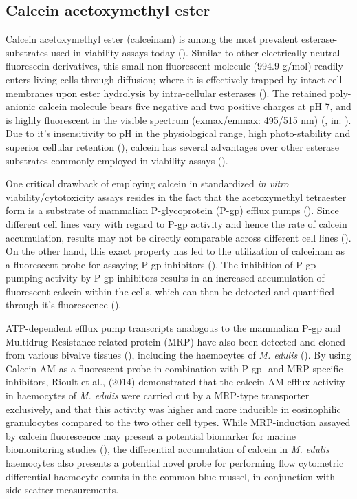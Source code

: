 \subsection{Calcein acetoxymethyl ester}
Calcein acetoxymethyl ester (\acrshort{calceinam}) is among the most prevalent esterase-substrates used in viability assays today (\cite{Ramirez2010}). Similar to other electrically neutral fluorescein-derivatives, this small non-fluorescent molecule (994.9 g/mol) readily enters living cells through diffusion; where it is effectively trapped by intact cell membranes upon ester hydrolysis by intra-cellular esterases (\cite{Kaneshiro1993}). The retained poly-anionic calcein molecule bears five negative and two positive charges at pH 7, and is highly fluorescent in the visible spectrum (\acrshort{exmax}/\acrshort{emmax}: 495/515 nm) (\cite{Wallach1959}, in: \cite{Chiu1977}). Due to it's  insensitivity to pH in the physiological range, high photo-stability and superior cellular retention (\cite{Chiu1977, Kaneshiro1993}), calcein has several advantages over other esterase substrates commonly employed in viability assays (\cite{Ramirez2010}).

One critical drawback of employing calcein in standardized \emph{in vitro} viability/cytotoxicity assays resides in the fact that the acetoxymethyl tetraester form is a substrate of mammalian P-glycoprotein (P-gp) efflux pumps (\cite{Liminga1995}). Since different cell lines vary with regard to P-gp activity and hence the rate of calcein accumulation, results may not be directly comparable across different cell lines (\cite{Ramirez2010}). On the other hand, this exact property has led to the utilization of \acrshort{calceinam} as a fluorescent probe for assaying P-gp inhibitors (\cite{Di2016}). 
The inhibition of P-gp pumping activity by P-gp-inhibitors results in an increased accumulation of fluorescent calcein within the cells, which can then be detected and quantified through it's fluorescence (\cite{Tiberghien1996, Köhler2003}).

ATP-dependent efflux pump transcripts analogous to the mammalian P-gp and Multidrug Resistance-related protein (MRP) have also been detected and cloned from various bivalve tissues (\cite{Luckenbach2008, Luedeking2005}), including the haemocytes of \emph{M. edulis} (\cite{Rioult2014}). By using Calcein-AM as a fluorescent probe in combination with P-gp- and MRP-specific inhibitors, Rioult et al., (2014) demonstrated that the calcein-AM efflux activity in haemocytes of \emph{M. edulis} were carried out by a MRP-type transporter exclusively, and that this activity was higher and more inducible in eosinophilic granulocytes compared to the two other cell types. While MRP-induction assayed by calcein fluorescence may present a potential biomarker for marine biomonitoring studies (\cite{Rioult2014, Minier1998}), the differential accumulation of calcein in \emph{M. edulis} haemocytes also presents a potential novel probe for performing flow cytometric differential haemocyte counts in the common blue mussel, in conjunction with side-scatter measurements.

